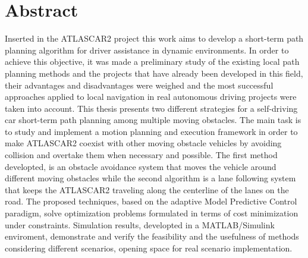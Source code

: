 \chapter*{Abstract}
\thispagestyle{empty}
Inserted in the ATLASCAR2 project this work aims to develop a short-term path planning algorithm
for driver assistance in dynamic environments. In order to achieve this objective, it was made a preliminary study of the existing local path planning methods and the projects that have already been developed in this field, their advantages and disadvantages were weighed
and the most successful approaches applied to local navigation in real autonomous driving projects were taken into account.
This thesis presents two different strategies for a self-driving car short-term path planning among multiple moving obstacles. The main task is to study and implement a motion planning and execution framework in order to make ATLASCAR2 coexist with other moving obstacle vehicles by avoiding collision and overtake them when necessary and possible. The first method developted, is an obstacle avoidance system that moves the vehicle around different moving obstacles while the second algorithm is a lane following system that keeps the ATLASCAR2 traveling along the centerline of the lanes on the road. The proposed techniques, based on the adaptive Model Predictive Control paradigm, solve optimization problems formulated in terms of cost minimization under constraints. Simulation results, developted in a MATLAB/Simulink enviroment, demonstrate and verify the feasibility and the usefulness of methods considering different scenarios, opening space for real scenario implementation.